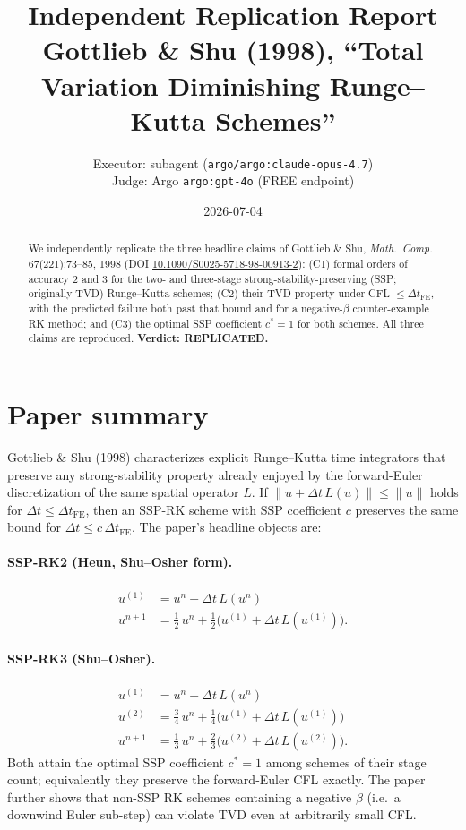 \documentclass[11pt]{article}
\title{Independent Replication Report\\
\large Gottlieb \& Shu (1998), ``Total Variation Diminishing Runge--Kutta Schemes''}
\author{Executor: subagent (\texttt{argo/argo:claude-opus-4.7})\\
Judge: Argo \texttt{argo:gpt-4o} (FREE endpoint)}
\date{2026-07-04}
\begin{document}
\maketitle

\begin{abstract}
We independently replicate the three headline claims of Gottlieb \& Shu,
\emph{Math.\ Comp.} 67(221):73--85, 1998 (DOI
\href{https://doi.org/10.1090/S0025-5718-98-00913-2}{10.1090/S0025-5718-98-00913-2}):
(C1) formal orders of accuracy 2 and 3 for the two- and three-stage
strong-stability-preserving (SSP; originally TVD) Runge--Kutta schemes;
(C2) their TVD property under CFL $\le \Delta t_{\mathrm{FE}}$, with the
predicted failure both past that bound and for a negative-$\beta$
counter-example RK method; and (C3) the optimal SSP coefficient
$c^{\ast} = 1$ for both schemes. All three claims are reproduced.
\textbf{Verdict: REPLICATED.}
\end{abstract}

\section{Paper summary}

Gottlieb \& Shu (1998) characterizes explicit Runge--Kutta time integrators
that preserve any strong-stability property already enjoyed by the
forward-Euler discretization of the same spatial operator $L$. If
$\|u + \Delta t\,L(u)\| \le \|u\|$ holds for $\Delta t \le \Delta
t_{\mathrm{FE}}$, then an SSP-RK scheme with SSP coefficient $c$ preserves
the same bound for $\Delta t \le c\,\Delta t_{\mathrm{FE}}$. The paper's
headline objects are:

\paragraph{SSP-RK2 (Heun, Shu--Osher form).}
\begin{align*}
u^{(1)} &= u^{n} + \Delta t\, L(u^{n})\\
u^{n+1} &= \tfrac{1}{2}\,u^{n} + \tfrac{1}{2}\bigl(u^{(1)} + \Delta t\,L(u^{(1)})\bigr).
\end{align*}

\paragraph{SSP-RK3 (Shu--Osher).}
\begin{align*}
u^{(1)} &= u^{n} + \Delta t\, L(u^{n})\\
u^{(2)} &= \tfrac{3}{4}\,u^{n} + \tfrac{1}{4}\bigl(u^{(1)} + \Delta t\,L(u^{(1)})\bigr)\\
u^{n+1} &= \tfrac{1}{3}\,u^{n} + \tfrac{2}{3}\bigl(u^{(2)} + \Delta t\,L(u^{(2)})\bigr).
\end{align*}
Both attain the optimal SSP coefficient $c^{\ast} = 1$ among schemes of
their stage count; equivalently they preserve the forward-Euler CFL
exactly. The paper further shows that non-SSP RK schemes containing a
negative $\beta$ (i.e.\ a downwind Euler sub-step) can violate TVD even at
arbitrarily small CFL.
\end{document}
